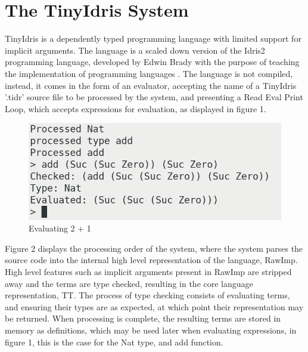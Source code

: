 \documentclass[a4paper]{article}
\begin{document}
\clearpage

\section{The TinyIdris System}
\label{sec:org2a24981}

TinyIdris is a dependently typed programming language with limited
support for implicit arguments. The language is a scaled down version
of the Idris2 programming language, developed by Edwin Brady with the
purpose of teaching the implementation of programming languages
\cite{Splv'202020Aug}. The language is not compiled, instead, it comes
in the form of an evaluator, accepting the name of a 
TinyIdris '.tidr' source file to be processed by the system,
and presenting a Read Eval Print Loop, which accepts expressions for
evaluation, as displayed in figure 1.

\begin{center}
\begin{figure}[htbp]
\centering
\includegraphics[scale=0.4]{./Resource/addEval.png}
\caption{Evaluating 2 + 1}
\end{figure}
\end{center}

Figure 2 displays the processing order of the system, where
the system parses the source code into the internal high level representation of
the language, RawImp. High level features such as implicit arguments present in RawImp are
stripped away and the terms are type checked, resulting in the core language representation, TT.
The process of type checking consists of evaluating terms, and ensuring their types are as expected,
at which point their representation may be returned.
When processing is complete, the resulting terms are stored in memory as definitions, which may be
used later when evaluating expressions, in figure 1, this is the case for the Nat type, and add function.
\end{document}
